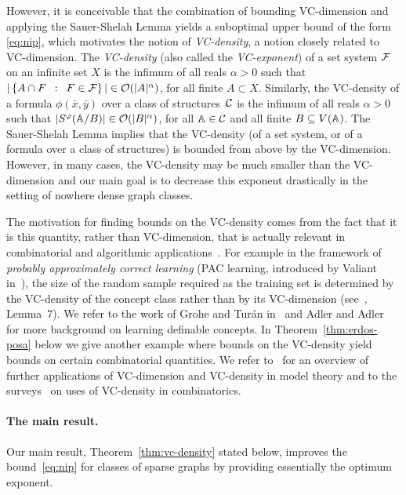 However, it is conceivable that the combination of 
bounding VC-dimension and applying the
Sauer-Shelah Lemma yields a suboptimal upper bound of the form 
\eqref{eq:nip}, which 
motivates the notion of \emph{VC-density}, a notion closely related to 
VC-dimension. The \emph{VC-density} (also called the 
\emph{VC-exponent})
of a set system $\cal F$
on an infinite set $X$ is the infimum of all reals $\alpha>0$ such that 
$|\setof{A\cap F}{F\in \cal F}|\in \Oof(|A|^\alpha)$, for all finite $A\subset X$. 
Similarly, the VC-density of a formula $\phi(\bar x,\bar y)$ over a class of structures~$\cal C$
is the infimum of all reals $\alpha>0$
such that $|S^\phi(\str A/B)|\in \Oof(|B|^\alpha)$,
for all $\str A\in \cal C$ and all finite $B\subset V(\str A)$.
The Sauer-Shelah Lemma
implies that the VC-density (of a set system, or of a formula over a class of structures) is bounded from above by the VC-dimension. 
However, in many cases, the VC-density may be much smaller than the VC-dimension and
our main goal is to decrease this exponent drastically in the setting of nowhere dense graph classes.

The motivation for finding bounds on the VC-density  comes from the fact that it is this quantity, rather than VC-di\-men\-sion, that is actually relevant in combinatorial
and algorithmic applications~\cite{Bronnimann1995,matouvsek1998geometric,Matousek:2004:BVI:1005787.1005789,chervonenkis1971theory,blumer1989learnability}. %
For example in the framework of \emph{probably approximately correct learning} 
(PAC learning, introduced by Valiant in~\cite{valiant1984theory}), the size of 
the random sample required as the training set is determined by the VC-density of the concept class 
rather than by its VC-dimension 
(see~\cite{blumer1989learnability}, Lemma~7). 
We refer to the work of Grohe and Tur\'an in~\cite{grohe2004learnability}
and Adler and Adler~\cite{adler2014interpreting} for more background on 
learning definable concepts. 
In Theorem~\ref{thm:erdos-posa} below we give another example where bounds on the VC-density yield bounds on certain combinatorial quantities.
We refer to~\cite{aschenbrenner2016vapnik} for an overview of 
further applications of VC-dimension and VC-density in model
theory and to the surveys~\cite{furedi1991traces,matouvsek1998geometric} 
on uses of VC-density in
combinatorics. 

\paragraph{The main result.}
Our main result, Theorem~\ref{thm:vc-density} stated below, improves the bound~\eqref{eq:nip} for classes of sparse graphs
by providing essentially the optimum exponent.

